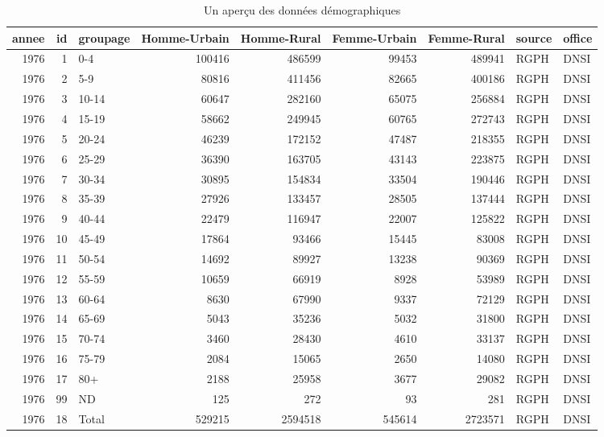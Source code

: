 \documentclass[]{book}
\begin{document}
\begin{table}[t]

\caption{\label{tab:unnamed-chunk-228}Un aperçu des données démographiques}
\centering
\begin{tabular}{r|r|l|r|r|r|r|l|l}
\hline
annee & id & groupage & Homme-Urbain & Homme-Rural & Femme-Urbain & Femme-Rural & source & office\\
\hline
1976 & 1 & 0-4 & 100416 & 486599 & 99453 & 489941 & RGPH & DNSI\\
\hline
1976 & 2 & 5-9 & 80816 & 411456 & 82665 & 400186 & RGPH & DNSI\\
\hline
1976 & 3 & 10-14 & 60647 & 282160 & 65075 & 256884 & RGPH & DNSI\\
\hline
1976 & 4 & 15-19 & 58662 & 249945 & 60765 & 272743 & RGPH & DNSI\\
\hline
1976 & 5 & 20-24 & 46239 & 172152 & 47487 & 218355 & RGPH & DNSI\\
\hline
1976 & 6 & 25-29 & 36390 & 163705 & 43143 & 223875 & RGPH & DNSI\\
\hline
1976 & 7 & 30-34 & 30895 & 154834 & 33504 & 190446 & RGPH & DNSI\\
\hline
1976 & 8 & 35-39 & 27926 & 133457 & 28505 & 137444 & RGPH & DNSI\\
\hline
1976 & 9 & 40-44 & 22479 & 116947 & 22007 & 125822 & RGPH & DNSI\\
\hline
1976 & 10 & 45-49 & 17864 & 93466 & 15445 & 83008 & RGPH & DNSI\\
\hline
1976 & 11 & 50-54 & 14692 & 89927 & 13238 & 90369 & RGPH & DNSI\\
\hline
1976 & 12 & 55-59 & 10659 & 66919 & 8928 & 53989 & RGPH & DNSI\\
\hline
1976 & 13 & 60-64 & 8630 & 67990 & 9337 & 72129 & RGPH & DNSI\\
\hline
1976 & 14 & 65-69 & 5043 & 35236 & 5032 & 31800 & RGPH & DNSI\\
\hline
1976 & 15 & 70-74 & 3460 & 28430 & 4610 & 33137 & RGPH & DNSI\\
\hline
1976 & 16 & 75-79 & 2084 & 15065 & 2650 & 14080 & RGPH & DNSI\\
\hline
1976 & 17 & 80+ & 2188 & 25958 & 3677 & 29082 & RGPH & DNSI\\
\hline
1976 & 99 & ND & 125 & 272 & 93 & 281 & RGPH & DNSI\\
\hline
1976 & 18 & Total & 529215 & 2594518 & 545614 & 2723571 & RGPH & DNSI\\
\hline
\end{tabular}
\end{table}
\end{document}
